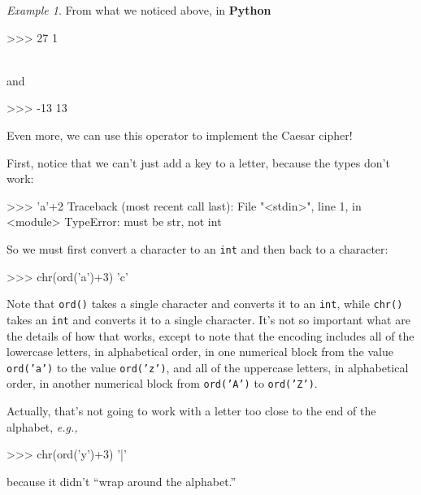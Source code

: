 \documentclass[12pt,letterpaper]{amsbook}
\theoremstyle{definition}
\theoremstyle{remark}
\newtheorem{example}[theorem]{Example}
\numberwithin{figure}{section}
\numberwithin{exercise}{chapter}
\numberwithin{section}{chapter}
\numberwithin{equation}{section}
\numberwithin{table}{subsection}
\newcommand{\code}[1]{\colorbox{lg}{\texttt{#1}}}
\newcommand{\Python}{{\textbf{\ix{Python}}}}
\newcommand{\ix}[1]{{#1}\index{#1}}
\begin{document}
\begin{example}\label{eg:basicmodsinPy}
  From what we noticed above, in \Python
  
  \noindent\begin{codedisp}
    >>> 27%
    1
  \end{codedisp}
  \\
  and\\[2mm]
  \noindent\begin{codedisp}
    >>> -13%
    13
  \end{codedisp}
  
  \noindent Even more, we can use this operator to implement the Caesar cipher!

  First, notice that we can't just add a key to a letter, because the types
  don't work:

  \noindent\begin{codedisp}
    >>> 'a'+2
    Traceback (most recent call last):
      File "<stdin>", line 1, in <module>
    TypeError: must be str, not int
  \end{codedisp}

  So we must first convert a character to an \code{int} and then back to
  a character:\\
  \noindent\begin{codedisp}
    >>> chr(ord('a')+3)
    'c'
  \end{codedisp}
  
  Note that \code{ord()} takes a single character and converts it to an
  \code{int}, while \code{chr()} takes an \code{int} and
  converts it to a single character.  It's not so important what
  are the details of how that works, except to note that the encoding includes
  all of the lowercase letters, in alphabetical order, in one numerical block
  from the value \code{ord('a')} to the value \code{ord('z')}, and
  all of the uppercase letters, in alphabetical order, in another numerical
  block from \code{ord('A')} to \code{ord('Z')}.

  Actually, that's not going to work with a letter too close to the end of
  the alphabet, \textit{e.g.,}\\
  \noindent\begin{codedisp}
    >>> chr(ord('y')+3)
    '|'
  \end{codedisp}
  
  \noindent because it didn't ``wrap around the alphabet.''


\end{example}
\end{document}
